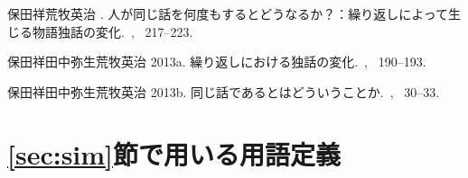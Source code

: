 \documentclass[japanese]{jnlp_1.4}
\begin{document}
\begin{thebibliography}{}
保田祥\JBA 荒牧英治 \BBCP.
\newblock
  人が同じ話を何度もするとどうなるか？：繰り返しによって生じる物語独話の変化.\
\newblock {}, \mbox{\BPGS\ 217--223}.

保田祥\JBA 田中弥生\JBA 荒牧英治 \BBOP 2013a\BBCP.
\newblock 繰り返しにおける独話の変化.\
\newblock {}, \mbox{\BPGS\ 190--193}.

保田祥\JBA 田中弥生\JBA 荒牧英治 \BBOP 2013b\BBCP.
\newblock 同じ話であるとはどういうことか.\
\newblock {}, \mbox{\BPGS\ 30--33}.

\end{thebibliography}



\appendix

\section{\ref{sec:sim}節で用いる用語定義}
\label{sec:app:term}
\end{document}
